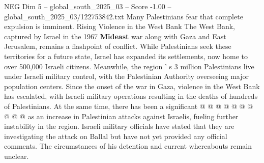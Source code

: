 \begin{textsample}{NEG Dim 5 – global\_south\_2025\_03 – Score -1.00 – global\_south\_2025\_03/122753842.txt}
Many Palestinians fear that complete expulsion is imminent.
Rising Violence in the West Bank The West Bank, captured by Israel in the 1967 \textbf{Mideast} war along with Gaza and East Jerusalem, remains a flashpoint of conflict.
While Palestinians seek these territories for a future state, Israel has expanded its settlements, now home to over 500,000 Israeli citizens.
Meanwhile, the region ' s 3 million Palestinians live under Israeli military control, with the Palestinian Authority overseeing major population centers.
Since the onset of the war in Gaza, violence in the West Bank has escalated, with Israeli military operations resulting in the deaths of hundreds of Palestinians.
At the same time, there has been a significant @ @ @ @ @ @ @ @ @ @ as an increase in Palestinian attacks against Israelis, fueling further instability in the region.
Israeli military officials have stated that they are investigating the attack on Ballal but have not yet provided any official comments.
The circumstances of his detention and current whereabouts remain unclear.

\end{textsample}
